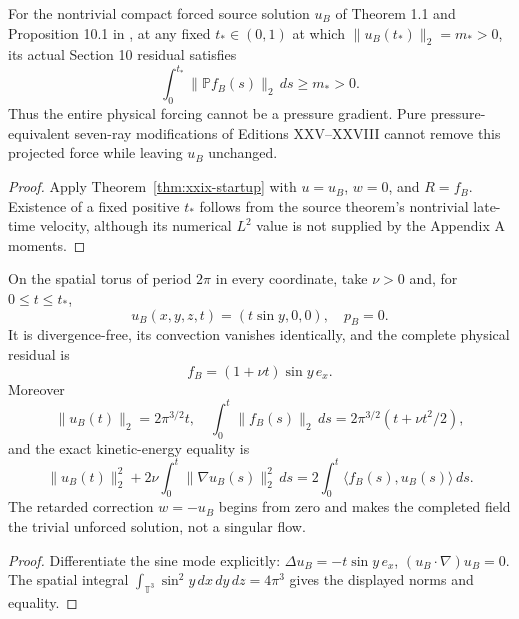 \begin{corollary}
\label{cor:xxix-real-force}
For the nontrivial compact forced source solution $u_B$
of Theorem 1.1 and Proposition 10.1 in \cite{openai2026},
at any fixed $t_*\in(0,1)$ at which
$\|u_B(t_*)\|_2=m_*>0$, its actual
Section 10 residual satisfies
\begin{equation}\label{eq:xxix-real-source-floor}
\boxed{\quad
\int_0^{t_*}\|\mathbb P f_B(s)\|_2\,ds\ge m_*>0.
\quad}
\end{equation}
Thus the entire physical forcing cannot be a pressure
gradient. Pure pressure-equivalent seven-ray modifications
of Editions XXV--XXVIII cannot remove this projected
force while leaving $u_B$ unchanged.
\end{corollary}
\begin{proof}
Apply Theorem~\ref{thm:xxix-startup} with $u=u_B$,
$w=0$, and $R=f_B$. Existence of a fixed positive
$t_*$ follows from the source theorem's nontrivial
late-time velocity, although its numerical $L^2$
value is not supplied by the Appendix A moments.
\end{proof}

\begin{proposition}
\label{prop:xxix-shear}
On the spatial torus of period $2\pi$ in every coordinate,
take $\nu>0$ and, for $0\le t\le t_*$,
\[
u_B(x,y,z,t)=(t\sin y,0,0),\quad p_B=0.
\]
It is divergence-free, its convection vanishes identically,
and the complete physical residual is
\[
f_B=(1+\nu t)\sin y\,e_x.
\]
Moreover
\[
\|u_B(t)\|_2=2\pi^{3/2}t,\quad
\int_0^t\|f_B(s)\|_2\,ds
=2\pi^{3/2}(t+\nu t^2/2),
\]
and the exact kinetic-energy equality is
\[
\|u_B(t)\|_2^2+
2\nu\int_0^t\|\nabla u_B(s)\|_2^2\,ds
=2\int_0^t\langle f_B(s),u_B(s)\rangle\,ds.
\]
The retarded correction $w=-u_B$ begins from zero and
makes the completed field the trivial unforced solution,
not a singular flow.
\end{proposition}
\begin{proof}
Differentiate the sine mode explicitly:
$\Delta u_B=-t\sin y\,e_x$,
$(u_B\cdot\nabla)u_B=0$. The spatial integral
$\int_{\mathbb T^3}\sin^2y\,dx\,dy\,dz=4\pi^3$
gives the displayed norms and equality.
\end{proof}

